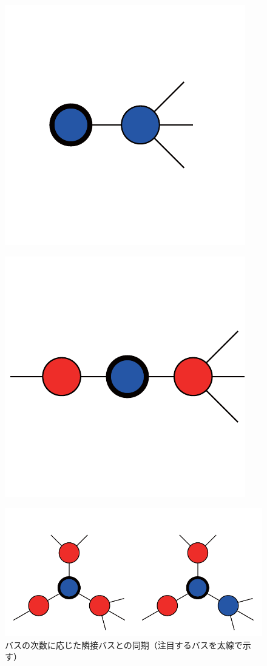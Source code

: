 \documentclass[tombow,dvipdfmx]{corona-a5}
\begin{document}
\begin{figure}[t]
  \centering
  {
  \begin{minipage}{0.3\linewidth}
    \centering
    \includegraphics[width = .60\linewidth]{figs/1degbus}
    \label{fig:N1} 
  \end{minipage}
  \begin{minipage}{0.3\linewidth}
    \centering
    \includegraphics[width = .60\linewidth]{figs/2degbus}
  \end{minipage}
  \label{fig:N2}
  \begin{minipage}{0.3\linewidth}
    \centering
    \includegraphics[width = .60\linewidth]{figs/3degbus}
  \end{minipage}
  \caption{バスの次数に応じた隣接バスとの同期（注目するバスを太線で示す）}
  \label{fig:bussync}
  }
\end{figure}
\end{document}
